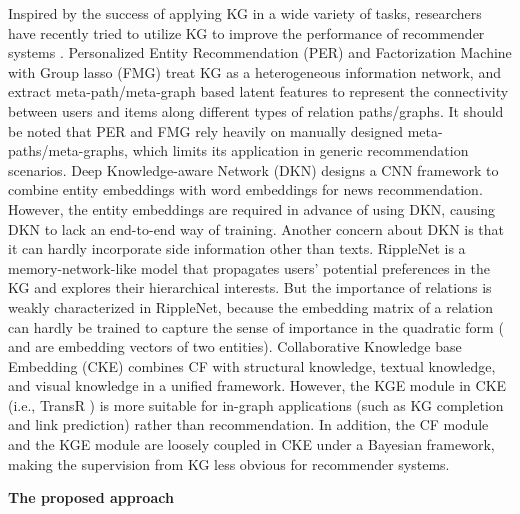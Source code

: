 \documentclass[sigconf]{acmart}
\begin{document}
	Inspired by the success of applying KG in a wide variety of tasks, researchers have recently tried to utilize KG to improve the performance of recommender systems \cite{yu2014personalized,zhao2017meta,wang2018dkn,wang2018ripple,zhang2016collaborative}.
	Personalized Entity Recommendation (PER) \cite{yu2014personalized} and Factorization Machine with Group lasso (FMG) \cite{zhao2017meta} treat KG as a heterogeneous information network, and extract meta-path/meta-graph based latent features to represent the connectivity between users and items along different types of relation paths/graphs.
	It should be noted that PER and FMG rely heavily on manually designed meta-paths/meta-graphs, which limits its application in generic recommendation scenarios.
	Deep Knowledge-aware Network (DKN) \cite{wang2018dkn} designs a CNN framework to combine entity embeddings with word embeddings for news recommendation.
	However, the entity embeddings are required in advance of using DKN, causing DKN to lack an end-to-end way of training.
	Another concern about DKN is that it can hardly incorporate side information other than texts.
	RippleNet \cite{wang2018ripple} is a memory-network-like model that propagates users' potential preferences in the KG and explores their hierarchical interests.
	But the importance of relations is weakly characterized in RippleNet, because the embedding matrix of a relation  can hardly be trained to capture the sense of importance in the quadratic form  ( and  are embedding vectors of two entities).
Collaborative Knowledge base Embedding (CKE) \cite{zhang2016collaborative} combines CF with structural knowledge, textual knowledge, and visual knowledge in a unified framework.
	However, the KGE module in CKE (i.e., TransR \cite{lin2015learning}) is more suitable for in-graph applications (such as KG completion and link prediction) rather than recommendation.
	In addition, the CF module and the KGE module are loosely coupled in CKE under a Bayesian framework, making the supervision from KG less obvious for recommender systems.
	
	\vspace{0.5em}
	\noindent\textbf{The proposed approach}	
	
\end{document}
